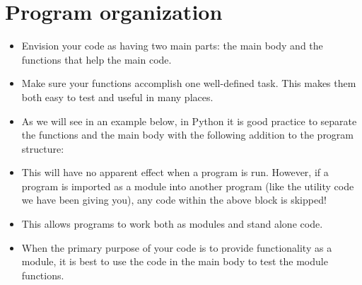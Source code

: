 \documentclass[letterpaper,10pt,english]{sphinxmanual}
\begin{document}
\section{Program organization}
\label{\detokenize{lecture_notes/lec11_conditionals2:program-organization}}\begin{itemize}
\item {} 
Envision your code as having two main parts: the main body and the
functions that help the main code.

\item {} 
Make sure your functions accomplish one well-defined task.  This
makes them both easy to test and useful in many places.

\item {} 
As we will see in an example below, in Python it is good practice to
separate the functions and the main body with the following
addition to the program structure:

%
\begin{sphinxVerbatim}[commandchars=\\\{\}]
   
\end{sphinxVerbatim}

\item {} 
This will have no apparent effect when a program is run.
However, if a program is imported as a module into another program
(like the utility code we have been giving you), any code within the
above  block is skipped!

\item {} 
This allows programs to work both as modules and stand alone
code.

\item {} 
When the primary purpose of your code is to provide functionality
as a module, it is best to use the code in the main body to test
the module functions.

\end{itemize}
\end{document}
